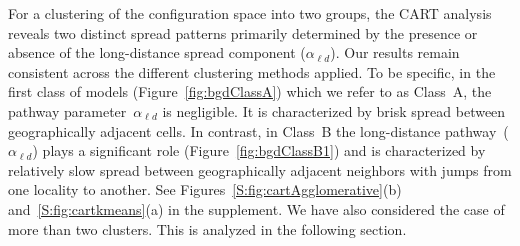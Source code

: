 \documentclass[11pt]{article}
\newcommand{\ald}{\alpha_{\ell d}}
\theoremstyle{definition}
\begin{document}
For a clustering of the configuration space into two groups, the CART
analysis reveals two distinct spread patterns primarily determined by the
presence or absence of the long-distance spread component ($\ald$). Our
results remain consistent across the different clustering methods applied.
To be specific, in the first class of models (Figure~\ref{fig:bgdClassA})
which we refer to as Class~A, the pathway parameter~$\ald$ is negligible.
It is characterized by brisk spread between geographically adjacent cells.
In contrast, in Class~B the long-distance pathway~($\ald$) plays a
significant role (Figure~\ref{fig:bgdClassB1}) and is characterized by
relatively slow spread between geographically adjacent neighbors with jumps
from one locality to another. See Figures~\ref{S:fig:cartAgglomerative}(b)
and~\ref{S:fig:cartkmeans}(a) in the supplement. We have also considered
the case of more than two clusters. This is analyzed in the following
section.
\end{document}
